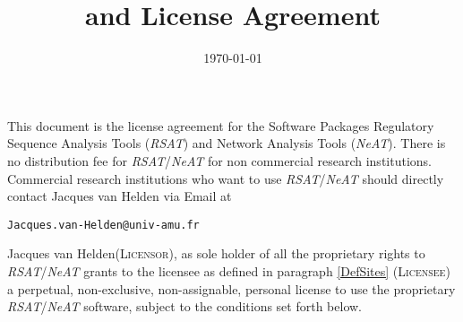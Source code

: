 \documentclass[12pt]{article}
\title{\RSAT and \NeAT License Agreement}
\author{\vspace*{-1cm}}
\date{\vspace*{-1cm}\today}
\makeatletter
\newcommand{\RSAT}[0]{\emph{RSAT}\xspace}
\newcommand{\NeAT}[0]{\emph{NeAT}\xspace}
\newcommand{\Licensorname}[0]{Jacques van Helden\xspace}
\newcommand{\Licensor}[0]{\textsc{Licensor}\xspace}
\newcommand{\Licensee}[0]{\textsc{Licensee}\xspace}
\newcommand{\JvHemail}[0]{\texttt{\small Jacques.van-Helden@univ-amu.fr}\xspace}
\makeatother
\begin{document}
\maketitle

This document is the license agreement for the Software Packages
Regulatory Sequence Analysis Tools (\RSAT) and Network Analysis Tools
(\NeAT).  There is no distribution fee for \RSAT/\NeAT for non commercial
research institutions. Commercial research institutions who want to
use \RSAT/\NeAT should directly contact Jacques van Helden via Email at
\begin{center}
  \JvHemail
\end{center}

\Licensorname (\Licensor), as sole holder of all the proprietary
rights to \RSAT/\NeAT grants to the licensee as defined in paragraph
\ref{DefSites} (\Licensee) a perpetual, non-exclusive, non-assignable,
personal license to use the proprietary \RSAT/\NeAT software, subject to the
conditions set forth below.
\end{document}
